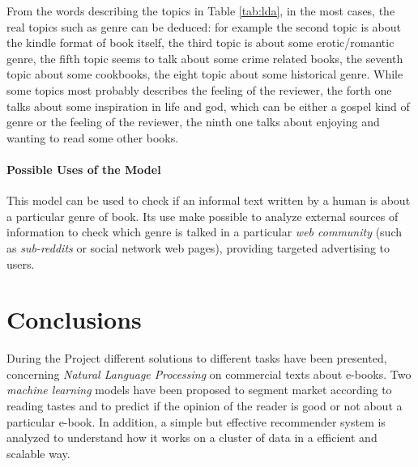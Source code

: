 \documentclass[fleqn,10pt]{SelfArx}
\begin{document}
From the words describing the topics in Table \ref{tab:lda}, in the most cases, the real topics such as genre can be deduced: for example the second topic is about the kindle format of book itself, the third topic is about some erotic/romantic genre, the fifth topic seems to talk about some crime related books, the seventh topic about some cookbooks, the eight topic about some historical genre.
While some topics most probably describes the feeling of the reviewer, the forth one talks about some inspiration in life and god, which can be either a gospel kind of genre or the feeling of the reviewer, the ninth one talks about enjoying and wanting to read some other books.

\subsection{Possible Uses of the Model}
This model can be used to check if an informal text written by a human is about a particular genre of book.
Its use make possible to analyze external sources of information to check which genre is talked in a particular \textit{web community} (such as \textit{sub-reddits} or social network web pages), providing targeted advertising to users.



\newpage
\part*{Conclusions}
During the Project different solutions to different tasks have been presented, concerning \textit{Natural Language Processing} on commercial texts about e-books.
Two \textit{machine learning} models have been proposed to segment market according to reading tastes and to predict if the opinion of the reader is good or not about a particular e-book.
In addition, a simple but effective recommender system is analyzed to understand how it works  on a cluster of data in a efficient and scalable way.

\newpage
\nocite{*}
\printbibliography


\end{document}
